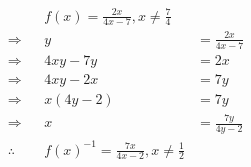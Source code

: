 \documentclass[
  preview
]{standalone}
\begin{document}
\begin{equation*}
\begin{split}
\nonumber 
      && f(x) = \frac{2x}{4x - 7},
          x \ne \frac{7}{4}\\
\Rightarrow &&         y &= \frac{2x}{4x - 7}\\
\Rightarrow &&  4xy - 7y &= 2x\\
\Rightarrow &&  4xy - 2x &= 7y\\
\Rightarrow && x(4y - 2) &= 7y\\
\Rightarrow &&         x &= \frac{7y}{4y - 2}\\
\therefore
 && f(x)^{-1} = \frac{7x}{4x - 2},
          x \ne \frac{1}{2}\\
\end{split}
\end{equation*}
\end{document}
